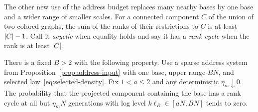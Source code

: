 The other new use of the address budget replaces many nearby bases
by one base and a wider range of smaller scales.  For a connected
component \(C\) of the union of two colored graphs, the sum of the
ranks of their restrictions to \(C\) is at least \(\lvert C\rvert-1\).
Call it \emph{acyclic} when equality
holds and say it has a \emph{rank cycle} when the rank is at least
\(\lvert C\rvert\).

\begin{lemma}
\label{lem:one-base-credit}
There is a fixed \(B>2\) with the following property.  Use a
sparse address system from Proposition~\ref{prop:address-input}
with one base, upper range \(BN\), and selected
law~\eqref{eq:selected-density}.  Fix \(1<a\le2\) and any
deterministic \(\eta_m\downarrow0\).  The probability that the
projected component containing the base has a rank cycle at all
but \(\eta_mN\) generations with log level
\(k\ell_R\in[aN,BN]\) tends to zero.
\end{lemma}

